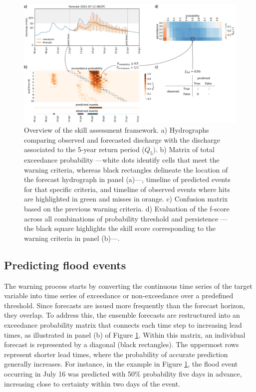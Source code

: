 \documentclass{ametsocV6.1}
\begin{document}
\begin{figure}
    \centering
    \includegraphics[width=1\textwidth]{figure01.pdf}
    \caption{Overview of the skill assessment framework. a) Hydrographs comparing observed and forecasted discharge with the discharge associated to the 5-year return period ($Q_5)$. b) Matrix of total exceedance probability —white dots identify cells that meet the warning criteria, whereas black rectangles delineate the location of the forecast hydrograph in panel (a)—, timeline of predicted events for that specific criteria, and timeline of observed events where hits are highlighted in green and misses in orange. c) Confusion matrix based on the previous warning criteria. d) Evaluation of the f-score across all combinations of probability threshold and persistence —the black square highlights the skill score corresponding to the warning criteria in panel (b)—.}
    \label{fig:scheme}
\end{figure}

\subsection{Predicting flood events}
\label{sec:methods_prediction}

The warning process starts by converting the continuous time series of the target variable into time series of exceedance or non-exceedance over a predefined threshold. Since forecasts are issued more frequently  than the forecast horizon, they overlap. To address this, the ensemble forecasts are restructured into an exceedance probability matrix that connects each time step to increasing lead times, as illustrated in panel (b) of Figure \ref{fig:scheme}. Within this matrix, an individual forecast is represented by a diagonal (black rectangles). The uppermost rows represent shorter lead times, where the probability of accurate prediction generally increases. For instance, in the example in Figure \ref{fig:scheme}, the flood event occurring in July 16 was predicted with 50\% probability five days in advance, increasing close to certainty within two days of the event.
\end{document}
